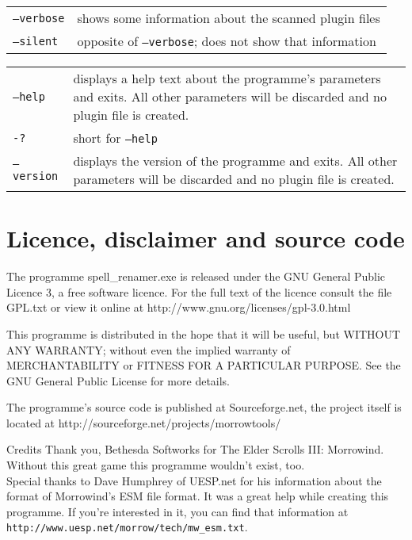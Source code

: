 \documentclass[12pt,oneside,a4paper]{article}
\begin{document}
\newline
\begin{tabular}{p{7cm} p{8cm}}
\texttt{--verbose}                & shows some information about the scanned plugin files\\
\texttt{--silent}                 & opposite of \texttt{--verbose}; does not show that information\\
\end{tabular}
\newline
\begin{tabular}{p{7cm} p{8cm}}
\texttt{--help}                   & displays a help text about the programme's parameters and exits. All other parameters will be discarded and no plugin file is created.\\
\texttt{-?}                       & short for \texttt{--help}\\
\texttt{--version}                & displays the version of the programme and exits. All other parameters will be discarded and no plugin file is created.\\
\end{tabular}

\section{Licence, disclaimer and source code}
The programme spell\_renamer.exe is released under the GNU General Public Licence 3,
a free software licence. For the full text of the licence consult the file GPL.txt
or view it online at http://www.gnu.org/licenses\slash gpl-3.0.html

This programme is distributed in the hope that it will be useful, but WITHOUT ANY
WARRANTY; without even the implied warranty of MERCHANTABILITY or FITNESS FOR A
PARTICULAR PURPOSE. See the GNU General Public License for more details.

The programme's source code is published at Sourceforge.net, the project itself
is located at http://sourceforge.net/projects/morrowtools/

\begin{section}{Credits}
Thank you, Bethesda Softworks for The Elder Scrolls III: Morrowind.
Without this great game this programme wouldn't exist, too.\\
Special thanks to Dave Humphrey of UESP.net for his information about the format
of Morrowind's ESM file format. It was a great help while creating this programme.
If you're interested in it, you can find that information at  \texttt{http://www.uesp.net\slash morrow\slash tech\slash{}mw\_esm.txt}.
\end{section}
\end{document}
